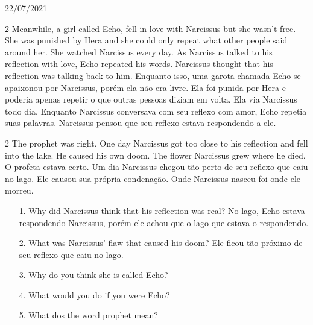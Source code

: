 \documentclass{SchoolBook}
\begin{document}
    \begin{day}{22/07/2021}
        \begin{multicols} 2
            Meanwhile, a girl called Echo, fell in love with Narcissus but she wasn't free. She was punished by Hera and she could only repeat what other people said around her. She watched Narcissus every day. As Narcissus talked to his reflection with love, Echo repeated his words. Narcissus thought that his reflection was talking back to him.
            \cbreak
            Enquanto isso, uma garota chamada Echo se apaixonou por Narcissus, porém ela não era livre. Ela foi punida por Hera e poderia apenas repetir o que outras pessoas diziam em volta. Ela via Narcissus todo dia. Enquanto Narcissus conversava com seu reflexo com amor, Echo repetia suas palavras. Narcissus pensou que seu reflexo estava respondendo a ele.
        \end{multicols}
        
        \begin{multicols} 2
            The prophet was right. One day Narcissus got too close to his reflection and fell into the lake. He caused his own doom. The flower Narcissus grew where he died.
            \cbreak
            O profeta estava certo. Um dia Narcissus chegou tão perto de seu reflexo que caiu no lago. Ele causou sua própria condenação. Onde Narcissus nasceu foi onde ele morreu.
        \end{multicols}
        
        \begin{enumerate}
            \item[1.] Why did Narcissus think that his reflection was real?
            \response No lago, Echo estava respondendo Narcissus, porém ele achou que o lago que estava o respondendo.
            
            \item[2.] What was Narcissus' flaw that caused his doom?
            \response Ele ficou tão próximo de seu reflexo que caiu no lago.
            
            \item[3.] Why do you think she is called Echo?
            \response 
            
            \item[4.] What would you do if you were Echo?
            \response
            
            \item[5.] What dos the word prophet mean?
            \response 
        \end{enumerate}
    \end{day}
\end{document}

